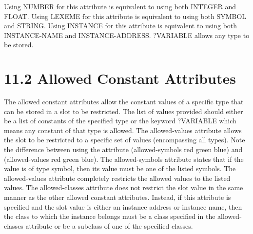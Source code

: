 \documentclass[letterpaper,10pt,english]{sphinxmanual}
\begin{document}
Using NUMBER for this attribute is equivalent to using both INTEGER and
FLOAT. Using LEXEME for this attribute is equivalent to using both
SYMBOL and STRING. Using INSTANCE for this attribute is equivalent to
using both INSTANCE-NAME and INSTANCE-ADDRESS. ?VARIABLE allows any type
to be stored.


\section{11.2 Allowed Constant Attributes}
\label{\detokenize{constraints:allowed-constant-attributes}}
The allowed constant attributes allow the constant values of a specific
type that can be stored in a slot to be restricted. The list of values
provided should either be a list of constants of the specified type or
the keyword ?VARIABLE which means any constant of that type is allowed.
The allowed-values attribute allows the slot to be restricted to a
specific set of values (encompassing all types). Note the difference
between using the attribute (allowed-symbols red green blue) and
(allowed-values red green blue). The allowed-symbols attribute states
that if the value is of type symbol, then its value must be one of the
listed symbols. The allowed-values attribute completely restricts the
allowed values to the listed values. The allowed-classes attribute does
not restrict the slot value in the same manner as the other allowed
constant attributes. Instead, if this attribute is specified and the
slot value is either an instance address or instance name, then the
class to which the instance belongs must be a class specified in the
allowed-classes attribute or be a subclass of one of the specified
classes.

\end{document}
